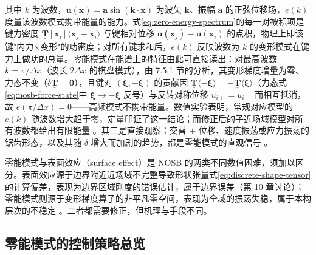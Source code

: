其中 $k$ 为波数，$\mathbf{u}(\mathbf{x})=\mathbf{a}\sin(\mathbf{k}\cdot\mathbf{x})$ 为波矢 $\mathbf{k}$、振幅 $\mathbf{a}$ 的正弦位移场，$e(k)$ 度量该波数模式携带能量的能力。式\eqref{eq:zero-energy-spectrum}的每一对被积项是键力密度 $\underline{\mathbf{T}}[\mathbf{x}_i]\langle\mathbf{x}_j-\mathbf{x}_i\rangle$ 与键相对位移 $\mathbf{u}(\mathbf{x}_j)-\mathbf{u}(\mathbf{x}_i)$ 的点积，物理上即该键"内力$\times$变形"的功密度；对所有键求和后，$e(k)$ 反映波数为 $k$ 的变形模式在键力上做功的总量。零能模式在能谱上的特征由此可直接读出：对最高波数 $k=\pi/\Delta x$（波长 $2\Delta x$ 的棋盘模式），由 7.5.1 节的分析，其变形梯度增量为零、力态不变（$\delta\underline{\mathbf{T}}=\mathbf{0}$），且键对 $(\boldsymbol{\xi},-\boldsymbol{\xi})$ 的贡献因 $\underline{\mathbf{T}}\langle-\boldsymbol{\xi}\rangle=-\underline{\mathbf{T}}\langle\boldsymbol{\xi}\rangle$（力态式\eqref{eq:nosb-force-state}中 $\boldsymbol{\xi}\to-\boldsymbol{\xi}$ 反号）与反转对称位移 $u_{i+}=u_{i-}$ 而相互抵消，故 $e(\pi/\Delta x)=0$——高频模式不携带能量。数值实验表明，常规对应模型的 $e(k)$ 随波数增大趋于零，定量印证了这一结论；而修正后的子近场域模型对所有波数都给出有限能量 \cite{Chowdhury2019}。其三是直接观察：交替 $\pm$ 位移、速度振荡或应力振荡的锯齿形态，以及其随 $\delta$ 增大而加剧的趋势，都是零能模式的直观信号 \cite{Breitenfeld2014}。

\begin{remark}
  零能模式与表面效应（surface effect）是 NOSB 的两类不同数值困难，须加以区分。表面效应源于边界附近近场域不完整导致形状张量式\eqref{eq:discrete-shape-tensor}的计算偏差，表现为边界区域刚度的错误估计，属于边界误差（第 10 章讨论）；零能模式则源于变形梯度算子的非平凡零空间，表现为全域的振荡失稳，属于本构层次的不稳定 \cite{Silling2017,LeBobaru2018}。二者都需要修正，但机理与手段不同。
\end{remark}

\subsection{零能模式的控制策略总览}\label{sec:zero-energy-control}

